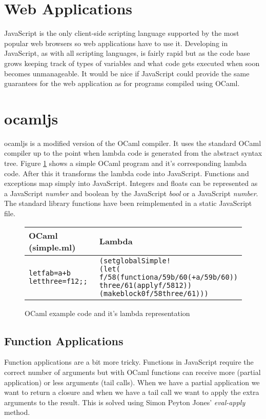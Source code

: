 \section{Web Applications}
JavaScript is the only client-side scripting language supported by the most popular web browsers so web applications have to use it. Developing in JavaScript, as with all scripting languages, is fairly rapid but as the code base grows keeping track of types of variables and what code gets executed when soon becomes unmanageable. It would be nice if JavaScript could provide the same guarantees for the web application as for programs compiled using OCaml.

\section{ocamljs}
ocamljs is a modified version of the OCaml compiler. It uses the standard OCaml compiler up to the point when lambda code is generated from the abstract syntax tree. Figure \ref{lambda} shows a simple OCaml program and it's corresponding lambda code. After this it transforms the lambda code into JavaScript. Functions and exceptions map simply into JavaScript. Integers and floats can be represented as a JavaScript \emph{number} and boolean by the JavaScript \emph{bool} or a JavaScript \emph{number}. The standard library functions have been reimplemented in a static JavaScript file.

\begin{figure}
  \begin{tabular}{| p{3.5cm} | p{7.8cm} |}
    \hline
    \textbf{OCaml (simple.ml)} & \textbf{Lambda}\\ \hline
    \begin{alltt}
let f a b = a+b
let three = f 1 2;;
    \end{alltt}
    &
    \begin{alltt}
(setglobal Simple!
  (let (
    f/58 (function a/59 b/60 (+ a/59 b/60))
    three/61 (apply f/58 1 2))
    (makeblock 0 f/58 three/61)))
    \end{alltt} \\ \hline
  \end{tabular}
  \caption{OCaml example code and it's lambda representation}
  \label{lambda}
\end{figure}

\subsection{Function Applications}
Function applications are a bit more tricky. Functions in JavaScript require the correct number of arguments but with OCaml functions can receive more (partial application) or less arguments (tail calls). When we have a partial application we want to return a closure and when we have a tail call we want to apply the extra arguments to the result. This is solved using Simon Peyton Jones' \emph{eval-apply} method.

